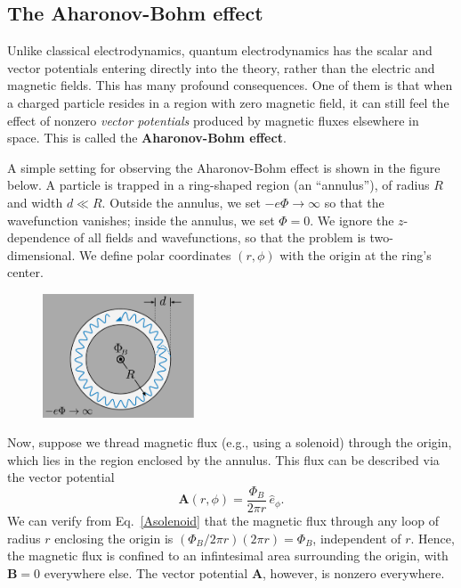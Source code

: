 \documentclass[pra,12pt]{revtex4}
\begin{document}
\subsection{The Aharonov-Bohm effect}

Unlike classical electrodynamics, quantum electrodynamics has the
scalar and vector potentials entering directly into the theory, rather
than the electric and magnetic fields.  This has many profound
consequences.  One of them is that when a charged particle resides in
a region with zero magnetic field, it can still feel the effect of
nonzero \textit{vector potentials} produced by magnetic fluxes
elsewhere in space.  This is called the \textbf{Aharonov-Bohm effect}.

A simple setting for observing the Aharonov-Bohm effect is shown in
the figure below.  A particle is trapped in a ring-shaped region (an
``annulus''), of radius $R$ and width $d \ll R$.  Outside the annulus,
we set $-e\Phi\rightarrow\infty$ so that the wavefunction vanishes;
inside the annulus, we set $\Phi = 0$.  We ignore the $z$-dependence
of all fields and wavefunctions, so that the problem is
two-dimensional.  We define polar coordinates $(r,\phi)$ with the
origin at the ring's center.

\begin{figure}[h]
  \centering\includegraphics[width=0.4\textwidth]{annulus}
\end{figure}

Now, suppose we thread magnetic flux (e.g., using a solenoid) through
the origin, which lies in the region enclosed by the annulus.  This
flux can be described via the vector potential
\begin{equation}
  \mathbf{A}(r,\phi) = \frac{\Phi_B}{2\pi r} \, \hat{e}_\phi.
  \label{Asolenoid}
\end{equation}
We can verify from Eq.~\eqref{Asolenoid} that the magnetic flux
through any loop of radius $r$ enclosing the origin is $(\Phi_B/2\pi
r)(2\pi r) = \Phi_B$, independent of $r$.  Hence, the magnetic flux is
confined to an infintesimal area surrounding the origin, with
$\mathbf{B} = 0$ everywhere else. The vector potential $\mathbf{A}$,
however, is nonzero everywhere.
\end{document}
